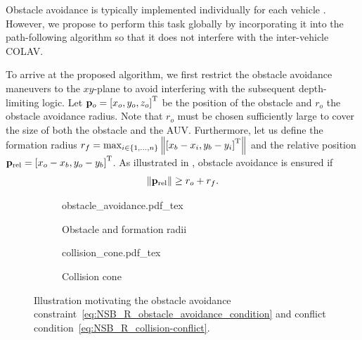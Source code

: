 Obstacle avoidance is typically implemented individually for each vehicle \cite{antonelli_2006_kinematic}.
However, we propose to perform this task globally by incorporating it into the path-following algorithm so that it does not interfere with the inter-vehicle COLAV. %

To arrive at the proposed algorithm, we first restrict the obstacle avoidance maneuvers to the $xy$-plane to avoid interfering with the subsequent depth-limiting logic.
Let $\mathbf{p}_o = \left[x_o, y_o, z_o\right]^{\mathrm{T}}$ be the position of the obstacle and $r_o$ the obstacle avoidance radius.
Note that $r_o$ must be chosen sufficiently large to cover the size of both the obstacle and the AUV. %
Furthermore, let us define the formation radius
$
    r_f = \max_{i \in \{1, \ldots, n\}} \left\|\left[x_b-x_i, y_b-y_i\right]^{\mathrm{T}}\right\|
$
and the relative position $\mathbf{p}_{\rm rel} = \left[x_o - x_b, y_o - y_b\right]^{\mathrm{T}}$. As illustrated in , obstacle avoidance is ensured if 
\begin{equation}
    \left\|\mathbf{p}_{\rm rel}\right\| \geq r_o + r_f. \label{eq:NSB_R_obstacle_avoidance_condition}
\end{equation}

\begin{figure}[t]
    \centering
    \begin{subfigure}[t]{0.33\textwidth}
        \centering
        \def\svgwidth{\textwidth}
        {obstacle_avoidance.pdf_tex}
        
        \caption{Obstacle and formation radii}
        \label{fig:NSB_R_obstacle_radius}
        
    \end{subfigure}   
    \begin{subfigure}[t]{0.33\textwidth}
        \centering
        \def\svgwidth{\textwidth}
        {collision_cone.pdf_tex}
        
        \caption{Collision cone}
        \label{fig:NSB_R_collision_cone}
        
    \end{subfigure} 
    \caption{Illustration motivating the obstacle avoidance constraint~\eqref{eq:NSB_R_obstacle_avoidance_condition} and conflict condition~\eqref{eq:NSB_R_collision-conflict}.}     
    
\end{figure}



